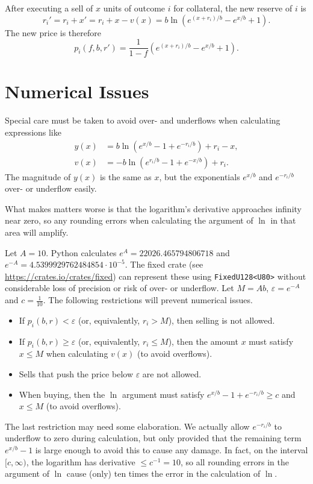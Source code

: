 \documentclass[12pt]{article}
\begin{document}
After executing a sell of $x$ units of outcome $i$ for collateral, the new reserve of $i$ is
\[
    r_i' = r_i + x' = r_i + x - v(x) = b \ln (e^{(x + r_i)/b} - e^{x/b} + 1).
\]
The new price is therefore
\[
    p_i(f, b, r') = \frac{1}{1-f} (e^{(x + r_i)/b} - e^{x/b} + 1).
\]

\section{Numerical Issues}

Special care must be taken to avoid over- and underflows when calculating expressions like
\begin{align*}
    y(x) &= b \ln (e^{x/b} - 1 + e^{-r_i/b}) + r_i - x, \\
    v(x) &= -b \ln (e^{r_i/b} - 1 + e^{-x/b}) + r_i.
\end{align*}
The magnitude of $y(x)$ is the same as $x$, but the exponentials $e^{x/b}$ and $e^{-r_i/b}$ over- or underflow easily.

What makes matters worse is that the logarithm's derivative approaches infinity near zero, so any rounding errors when calculating the argument of $\ln$ in that area will amplify.

Let $A = 10$. Python calculates $e^A = 22026.465794806718$ and $e^{-A} = 4.5399929762484854 \cdot 10^{-5}$. The fixed crate (see \url{https://crates.io/crates/fixed}) can represent these using \texttt{FixedU128<U80>} without considerable loss of precision or risk of over- or underflow. Let $M = Ab$, $\varepsilon = e^{-A}$ and $c = \frac{1}{10}$. The following restrictions will prevent numerical issues.

\begin{itemize}
    \item If $p_i(b, r) < \varepsilon$ (or, equivalently, $r_i > M$), then selling is not allowed.
    \item If $p_i(b, r) \geq \varepsilon$ (or, equivalently, $r_i \leq M$), then the amount $x$ must satisfy $x \leq M$ when calculating $v(x)$ (to avoid overflows).
    \item Sells that push the price below $\varepsilon$ are not allowed.
    \item When buying, then the $\ln$ argument must satisfy $e^{x/b} - 1 + e^{-r_i/b} \geq c$ and $x \leq M$ (to avoid overflows).
\end{itemize}

The last restriction may need some elaboration. We actually allow $e^{-r_i/b}$ to underflow to zero during calculation, but only provided that the remaining term $e^{x/b} - 1$ is large enough to avoid this to cause any damage. In fact, on the interval $[c, \infty)$, the logarithm has derivative $\leq c^{-1} = 10$, so all rounding errors in the argument of $\ln$ cause (only) ten times the error in the calculation of $\ln$. 
\end{document}
